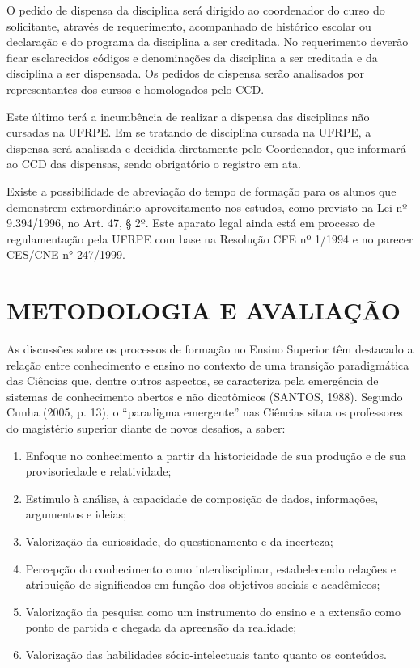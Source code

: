 \documentclass[
	12pt,				%
	openright,			%
  oneside,     %
	a4paper,			%
	chapter=TITLE,		%
	english,			%
	french,				%
	spanish,			%
	brazil				%
	]{abntex2}
\begin{document}
O pedido de dispensa da disciplina será dirigido ao coordenador do curso do solicitante, através de requerimento, acompanhado de histórico escolar ou declaração e do programa da disciplina a ser creditada. No requerimento deverão ficar esclarecidos códigos e denominações da disciplina a ser creditada e da disciplina a ser dispensada. Os pedidos de dispensa serão analisados por representantes dos cursos e homologados pelo CCD.

Este último terá a incumbência de realizar a dispensa das disciplinas não cursadas na UFRPE. Em se tratando de disciplina cursada na UFRPE, a dispensa será analisada e decidida diretamente pelo Coordenador, que informará ao CCD das dispensas, sendo obrigatório o registro em ata.

Existe a possibilidade de abreviação do tempo de formação para os alunos que demonstrem extraordinário aproveitamento nos estudos, como previsto na Lei nº 9.394/1996, no Art. 47, § 2º. Este aparato legal ainda está em processo de regulamentação pela UFRPE com base na Resolução CFE nº 1/1994 e no parecer CES/CNE n° 247/1999.





%
%




\chapter{METODOLOGIA E AVALIAÇÃO}
\label{cap_metodologia_e_avaliacao}

As discussões sobre os processos de formação no Ensino Superior têm destacado a relação entre conhecimento e ensino no contexto de uma transição paradigmática das Ciências que, dentre outros aspectos, se caracteriza pela emergência de sistemas de conhecimento abertos e não dicotômicos (SANTOS, 1988). Segundo Cunha (2005, p. 13), o “paradigma emergente” nas Ciências situa os professores do magistério superior diante de novos desafios, a saber:

\begin{enumerate}[label=(\alph*)]
    \item Enfoque no conhecimento a partir da historicidade de sua produção e de sua provisoriedade e relatividade;
    \item Estímulo à análise, à capacidade de composição de dados, informações, argumentos e ideias;
    \item Valorização da curiosidade, do questionamento e da incerteza;
    \item Percepção do conhecimento como interdisciplinar, estabelecendo relações e atribuição de significados em função dos objetivos sociais e acadêmicos;
    \item Valorização da pesquisa como um instrumento do ensino e a extensão como ponto de partida e chegada da apreensão da realidade;
    \item Valorização das habilidades sócio-intelectuais tanto quanto os conteúdos.
\end{enumerate}
\end{document}
